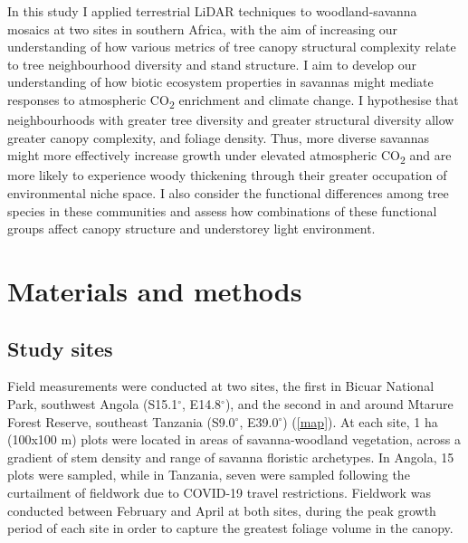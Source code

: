 \documentclass[11pt,a4paper]{article}
\begin{document}
In this study I applied terrestrial LiDAR techniques to woodland-savanna mosaics at two sites in southern Africa, with the aim of increasing our understanding of how various metrics of tree canopy structural complexity relate to tree neighbourhood diversity and stand structure. I aim to develop our understanding of how biotic ecosystem properties in savannas might mediate responses to atmospheric CO\textsubscript{2} enrichment and climate change. I hypothesise that neighbourhoods with greater tree diversity and greater structural diversity allow greater canopy complexity, and foliage density. Thus, more diverse savannas might more effectively increase growth under elevated atmospheric CO\textsubscript{2} and are more likely to experience woody thickening through their greater occupation of environmental niche space. I also consider the functional differences among tree species in these communities and assess how combinations of these functional groups affect canopy structure and understorey light environment.

\section{Materials and methods}

\subsection{Study sites}

Field measurements were conducted at two sites, the first in Bicuar National Park, southwest Angola (S15.1$^\circ$, E14.8$^\circ$), and the second in and around Mtarure Forest Reserve, southeast Tanzania (S9.0$^\circ$, E39.0$^\circ$) (\autoref{map}). At each site, 1 ha (100x100 m) plots were located in areas of savanna-woodland vegetation, across a gradient of stem density and range of savanna floristic archetypes. In Angola, 15 plots were sampled, while in Tanzania, seven were sampled following the curtailment of fieldwork due to COVID-19 travel restrictions. Fieldwork was conducted between February and April at both sites, during the peak growth period of each site in order to capture the greatest foliage volume in the canopy.
\end{document}
